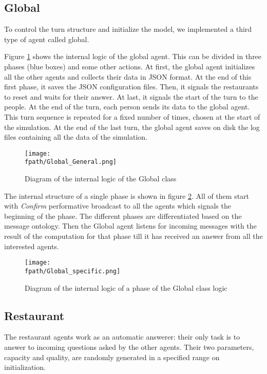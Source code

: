\documentclass[10pt,a4paper]{article}
\newcommand{\fpath}{./Figs/}
\begin{document}
\subsection{Global}
\label{subsec:global}
To control the turn structure and initialize the model, we implemented a third type of agent called global. 

Figure \ref{fig:global_flow_big} shows the internal logic of the global agent. This can be divided in three phases (blue boxes) and some other actions. At first, the global agent initializes all the other agents and collects their data in JSON format. At the end of this first phase, it saves the JSON configuration files. Then, it signals the restaurants to reset and waits for their answer. At last, it signals the start of the turn to the people. At the end of the turn, each person sends its data to the global agent. This turn sequence is repeated for a fixed number of times, chosen at the start of the simulation.
At the end of the last turn, the global agent saves on disk the log files containing all the data of the simulation.

\begin{figure}
\texttt{[image: \\fpath/Global\_General.png]}
\caption{Diagram of the internal logic of the Global class}
\label{fig:global_flow_big}
\end{figure}

The internal structure of a single phase is shown in figure \ref{fig:global_flow_small}. All of them start with \textit{Confirm} performative broadcast to all the agents which signals the beginning of the phase. The different phases are differentiated based on the message ontology. Then the Global agent listens for incoming messages with the result of the computation for that phase till it has received an answer from all the interested agents. 
\begin{figure}
\texttt{[image: \\fpath/Global\_specific.png]}
\caption{Diagram of the internal logic of a phase of the Global class logic}
\label{fig:global_flow_small}
\end{figure}

\subsection{Restaurant}
The restaurant agents work as an automatic answerer: their only task is to answer to incoming questions asked by the other agents. Their two parameters, capacity and quality, are randomly generated in a specified range on initialization.
\end{document}
